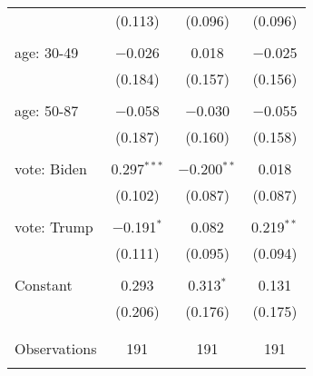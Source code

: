 \begin{tabular}{@{\extracolsep{5pt}}lccc}
  & (0.113) & (0.096) & (0.096) \\ 
  & & & \\ 
 age: 30-49 & $-$0.026 & 0.018 & $-$0.025 \\ 
  & (0.184) & (0.157) & (0.156) \\ 
  & & & \\ 
 age: 50-87 & $-$0.058 & $-$0.030 & $-$0.055 \\ 
  & (0.187) & (0.160) & (0.158) \\ 
  & & & \\ 
 vote: Biden & 0.297$^{***}$ & $-$0.200$^{**}$ & 0.018 \\ 
  & (0.102) & (0.087) & (0.087) \\ 
  & & & \\ 
 vote: Trump & $-$0.191$^{*}$ & 0.082 & 0.219$^{**}$ \\ 
  & (0.111) & (0.095) & (0.094) \\ 
  & & & \\ 
 Constant & 0.293 & 0.313$^{*}$ & 0.131 \\ 
  & (0.206) & (0.176) & (0.175) \\ 
  & & & \\ 
\hline \\[-1.8ex] 

Observations & 191 & 191 & 191 \\ 
\hline 
\hline \\[-1.8ex] 
\end{tabular} 